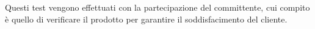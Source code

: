 Questi test vengono effettuati con la partecipazione del committente, cui compito è quello di verificare il prodotto per garantire il soddisfacimento del cliente.